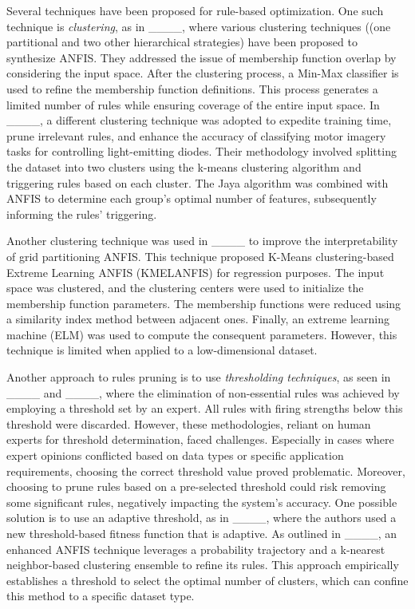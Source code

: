 Several techniques have been proposed for rule-based optimization. One such technique is \textit{clustering}, as in ____, where various clustering techniques ((one partitional and two other hierarchical strategies) have been proposed to synthesize ANFIS. They addressed the issue of membership function overlap by considering the input space. After the clustering process, a Min-Max classifier is used to refine the membership function definitions. This process generates a limited number of rules while ensuring coverage of the entire input space.
In ____, a different clustering technique was adopted to expedite training time, prune irrelevant rules, and enhance the accuracy of classifying motor imagery tasks for controlling light-emitting diodes. Their methodology involved splitting the dataset into two clusters using the k-means clustering algorithm and triggering rules based on each cluster. The Jaya algorithm was combined with ANFIS to determine each group's optimal number of features, subsequently informing the rules' triggering.

Another clustering technique was used in ____ to improve the interpretability of grid partitioning ANFIS. This technique proposed K-Means clustering-based Extreme Learning ANFIS (KMELANFIS) for regression purposes. The input space was clustered, and the clustering centers were used to initialize the membership function parameters. The membership functions were reduced using a similarity index method between adjacent ones. Finally, an extreme learning machine (ELM) was used to compute the consequent parameters. However, this technique is limited when applied to a low-dimensional dataset. 

Another approach to rules pruning is to use \textit{thresholding techniques}, as seen in ____ and  ____, where the elimination of non-essential rules was achieved by employing a threshold set by an expert. All rules with firing strengths below this threshold were discarded. However, these methodologies, reliant on human experts for threshold determination, faced challenges. Especially in cases where expert opinions conflicted based on data types or specific application requirements, choosing the correct threshold value proved problematic. Moreover, choosing to prune rules based on a pre-selected threshold could risk removing some significant rules, negatively impacting the system's accuracy. One possible solution is to use an adaptive threshold, as in ____, where the authors used a new threshold-based fitness function that is adaptive.
As outlined in ____, an enhanced ANFIS technique leverages a probability trajectory and a k-nearest neighbor-based clustering ensemble to refine its rules. This approach empirically establishes a threshold to select the optimal number of clusters, which can confine this method to a specific dataset type.

